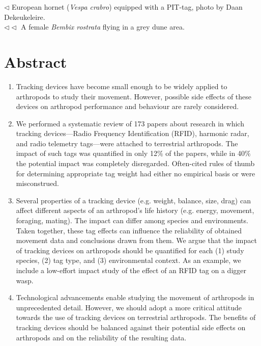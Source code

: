 \documentclass[10pt, twoside]{book} %
\begin{document}
\noindent \color{gray} $\lhd$ European hornet (\textit{Vespa crabro}) equipped with a PIT-tag, photo by Daan Dekeukeleire.\\
\noindent $\lhd\lhd$ A female \textit{Bembix rostrata} flying in a grey dune area.
	
\color{black}


\newpage

\renewcommand\thesection{\arabic{chapter}.\arabic{section}}
\renewcommand{\thefigure}{\arabic{chapter}.\arabic{figure}}
	\section{Abstract}
	\begin{enumerate}
		\item Tracking devices have become small enough to be widely applied to arthropods to study their movement. However, possible side effects of these devices on arthropod performance and behaviour are rarely considered.
		
		\item We performed a systematic review of 173 papers about research in which tracking devices---Radio Frequency Identification (RFID), harmonic radar, and radio telemetry tags---were attached to terrestrial arthropods. The impact of such tags was quantified in only 12$\%$ of the papers, while in 40$\%$ the potential impact was completely disregarded. Often-cited rules of thumb for determining appropriate tag weight had either no empirical basis or were misconstrued.
		
		\item Several properties of a tracking device (e.g. weight, balance, size, drag) can affect different aspects of an arthropod's life history (e.g. energy, movement, foraging, mating). The impact can differ among species and environments. Taken together, these tag effects can influence the reliability of obtained movement data and conclusions drawn from them. We argue that the impact of tracking devices on arthropods should be quantified for each (1) study species, (2) tag type, and (3) environmental context. As an example, we include a low-effort impact study of the effect of an RFID tag on a digger wasp.
		
		\item Technological advancements enable studying the movement of arthropods in unprecedented detail. However, we should adopt a more critical attitude towards the use of tracking devices on terrestrial arthropods. The benefits of tracking devices should be balanced against their potential side effects on arthropods and on the reliability of the resulting data.
		
	\end{enumerate}
\end{document}
